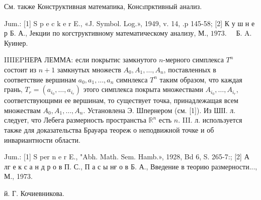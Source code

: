 \documentclass[10pt]{article}
\begin{document}
См. также Конструктивная матемапика, Консıпрктивный анализ.



Jum.: [1] S p e c k e r E., «J. Symbol. Log.», 1949, v. 14, .p 145-58; [2] К у ш н е р Б. А., Јекции по когструктивному математическому анализу, М., $1973 . \quad$ Б. A. Куинер.



IIIIEPHЕРА ЛЕММА: если покрытис замкнутого $n$-мерного симплекса $T^{n}$ состоит из $n+1$ замкнутых множеств $A_{0}, A_{1}, \ldots, A_{n}$, поставленных в соответствие вершинам $a_{0}, a_{1}, \ldots, a_{n}$ симнлекса $T^{n}$ таким образом, что каждая грань, $T_{r}=\left(a_{i_{0}}, \ldots, a_{i_{r}}\right)$ этого симплекса покрыта множествами $A_{i_{0}}, \ldots, A_{i_{r}}$, соответствующими ее вершинам, то существует точка, принадлежащая всем множествам $A_{0}, A_{1}, \ldots, A_{n}$. Установлена Э. Шпернером (см. [1]). Из ШІІ. л. следует, что Лебега размерность пространстьа $\mathbb{R}^{n}$ есть $n$. III. л. используется также для доказательства Брауәра теореж о неподвижной точке и об инвариантности области.



Jum.: [1] S per n e r E., "Abh. Math. Sem. Hamb.», 1928, Bd 6, S. 265-7:; [2] А лг е к с а н д р о в П. С., П а с ы нғ о в Б. А., Введение в теорию размерности..., М., 1973.



й. Г. Кочиевникова.
\end{document}

